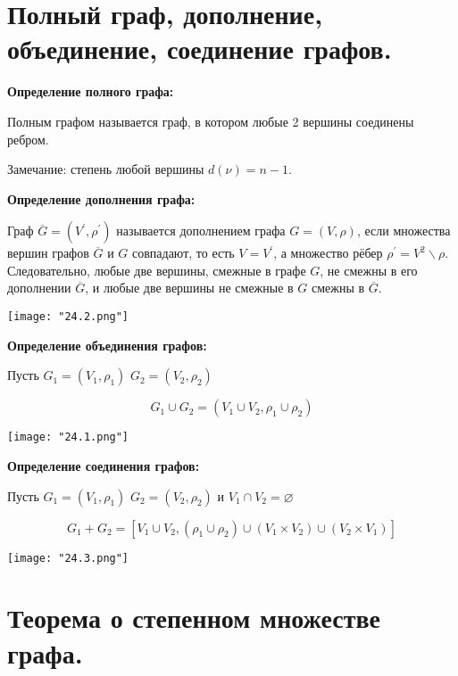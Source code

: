 \section{Полный граф, дополнение, объединение, соединение графов.}

\textbf{Определение полного графа:}
    \smallskip

    Полным графом называется граф, в котором любые 2 вершины соединены
    ребром.
    \smallskip

    Замечание: степень любой вершины $d(\nu) = n - 1$.
    \bigskip

\textbf{Определение дополнения графа:}
    \smallskip
    
    Граф $\overline{G} = (V^{'}, \rho^{'})$ называется дополнением графа
    $G = (V, \rho)$, если  множества вершин графов $\overline{G}$ и $G$ совпадают,
    то есть $V = V^{'}$,  а множество рёбер $\rho^{'} = V^2 \backslash \rho$.
    Следовательно, любые две вершины, смежные в графе $G$, не смежны в его дополнении
    $\overline{G}$, и любые две вершины не смежные в $G$ смежны в $\overline{G}$.

    \begin{center}
        \texttt{[image: "24.2.png"]}
    \end{center}

\textbf{Определение объединения графов:}
    \smallskip
    
    Пусть $G_1 = (V_1, \rho_1)$ $G_2 = (V_2, \rho_2)$

    \[
    G_1 \cup G_2 = (V_1 \cup V_2, \rho_1 \cup \rho_2)
    \]
    \smallskip

    \begin{center}
        \texttt{[image: "24.1.png"]}
    \end{center}

\textbf{Определение соединения графов:}    
    \smallskip

    Пусть $G_1 = (V_1, \rho_1)$ $G_2 = (V_2, \rho_2)$ и $V_1 \cap V_2 = \varnothing$

    \[
        G_1 + G_2 = \left[V_1 \cup V_2, (\rho_1 \cup \rho_2) \cup (V_1 \times V_2)
        \cup (V_2 \times V_1) \right]  
    \]
    \smallskip

    \begin{center}
        \texttt{[image: "24.3.png"]}
    \end{center}

\section{Теорема о степенном множестве графа.}

